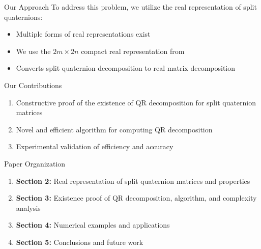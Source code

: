 \documentclass{beamer}
\begin{document}
\begin{frame}{Our Approach}
  To address this problem, we utilize the real representation of split quaternions:
  
  \begin{itemize}
    \item Multiple forms of real representations exist \cite{Zhuo2020, Yang2020, Xin2019, Gang2024}
    \item We use the $2m \times 2n$ compact real representation from \cite{Gang2024}
    \item Converts split quaternion decomposition to real matrix decomposition
  \end{itemize}
\end{frame}

\begin{frame}{Our Contributions}
  \begin{enumerate}
    \item Constructive proof of the existence of QR decomposition for split quaternion matrices
    \item Novel and efficient algorithm for computing QR decomposition
    \item Experimental validation of efficiency and accuracy
  \end{enumerate}
\end{frame}

\begin{frame}{Paper Organization}
  \begin{enumerate}
    \item \textbf{Section 2:} Real representation of split quaternion matrices and properties
    \item \textbf{Section 3:} Existence proof of QR decomposition, algorithm, and complexity analysis
    \item \textbf{Section 4:} Numerical examples and applications
    \item \textbf{Section 5:} Conclusions and future work
  \end{enumerate}
\end{frame}

\end{document}
